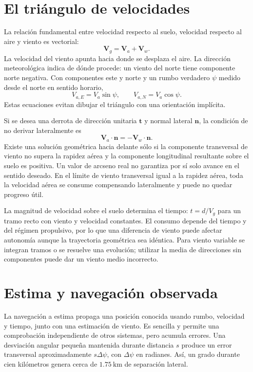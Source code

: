 \section{El triángulo de velocidades}
La relación fundamental entre velocidad respecto al suelo, velocidad respecto al aire y viento es vectorial:
\begin{equation}\label{eq:14-vector}
\boldsymbol V_g=\boldsymbol V_a+\boldsymbol V_w.
\end{equation}
La velocidad del viento apunta hacia donde se desplaza el aire. La dirección meteorológica indica de dónde procede: un viento del norte tiene componente norte negativa. Con componentes este y norte y un rumbo verdadero $\psi$ medido desde el norte en sentido horario,
\begin{equation}
V_{a,E}=V_a\sin\psi,\qquad V_{a,N}=V_a\cos\psi.
\end{equation}
Estas ecuaciones evitan dibujar el triángulo con una orientación implícita.

Si se desea una derrota de dirección unitaria $\boldsymbol t$ y normal lateral $\boldsymbol n$, la condición de no derivar lateralmente es
\begin{equation}
\boldsymbol V_a\cdot\boldsymbol n=-\boldsymbol V_w\cdot\boldsymbol n.
\end{equation}
Existe una solución geométrica hacia delante sólo si la componente transversal de viento no supera la rapidez aérea y la componente longitudinal resultante sobre el suelo es positiva. Un valor de arcseno real no garantiza por sí solo avance en el sentido deseado. En el límite de viento transversal igual a la rapidez aérea, toda la velocidad aérea se consume compensando lateralmente y puede no quedar progreso útil.

La magnitud de velocidad sobre el suelo determina el tiempo: $t=d/V_g$ para un tramo recto con viento y velocidad constantes. El consumo depende del tiempo y del régimen propulsivo, por lo que una diferencia de viento puede afectar autonomía aunque la trayectoria geométrica sea idéntica. Para viento variable se integran tramos o se resuelve una evolución; utilizar la media de direcciones sin componentes puede dar un viento medio incorrecto.

\section{Estima y navegación observada}
La navegación a estima propaga una posición conocida usando rumbo, velocidad y tiempo, junto con una estimación de viento. Es sencilla y permite una comprobación independiente de otros sistemas, pero acumula errores. Una desviación angular pequeña mantenida durante distancia $s$ produce un error transversal aproximadamente $s\Delta\psi$, con $\Delta\psi$ en radianes. Así, un grado durante cien kilómetros genera cerca de $1.75\ \mathrm{km}$ de separación lateral.

